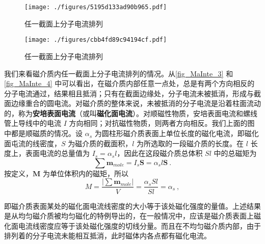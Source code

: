 \begin{figure}[ht]
\centering
\texttt{[image: ./figures/5195d133ad90b965.pdf]}
\caption{任一截面上分子电流排列} \label{fig_MaInte_3}
\end{figure}
\begin{figure}[ht]
\centering
\texttt{[image: ./figures/cbb4fd89c94194cf.pdf]}
\caption{任一截面上分子电流排列} \label{fig_MaInte_4}
\end{figure}
我们来看磁介质内任一截面上分子电流排列的情况。从\autoref{fig_MaInte_3} 和\autoref{fig_MaInte_4} 中可以看出，在磁介质内部任意一点处，总是有两个方向相反的分子电流通过，结果相且抵消；只有在截面边缘处，分子电流未被抵消，形成与截面边缘重合的圆电流。对磁介质的整体来说，未被抵消的分子电流是沿着柱面流动的，称为\textbf{安培表面电流}（或叫\textbf{磁化面电流}）。对顺磁性物质，安培表面电流和螺线管上导线中的电流 $I$ 方向相同；对抗磁性物质，则两者方向相反。我们上面的图中都是顺磁质的情况。设 $\alpha_s$ 为圆柱形磁介质表面上单位长度的磁化电流，即磁化面屯流的线密度，$S$ 为磁介质的截面积，$ l $ 为所选取的一段磁介质的长度。在 $l $ 长度上，表面电流的总量值为 $I_s=\alpha_sl$，因此在这段磁介质总体积 $Sl$ 中的总磁矩为
\begin{equation}
\sum \mathbf{m}_{mole}=I_{s} \mathbf S=\alpha_{s} l \mathbf S~.
\end{equation}
按定义，$\mathbf  M $ 为单位体积内的磁矩，所以
\begin{equation}
M=\frac{\left|\sum \mathbf  m_{mole}\right|}{V}=\frac{\alpha_{s} S l}{S l}=\alpha_s~,
\end{equation}

即磁介质表面某处的磁化面电流线密度的大小等于该处磁化强度的量值。上述结果是从均匀磁介质被均匀磁化的特例导出的，在一般情况中，应该是磁介质表面上磁化面电流线密度应等于该处磁化强度的切线分量。而且在不均匀磁介质内部，由于排列着的分子电流未能相互抵消，此时磁体内各点都有磁化电流。

